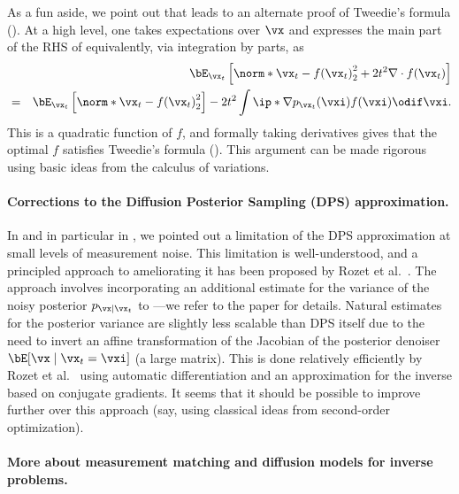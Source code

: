 \documentclass[../../book-main.tex]{subfiles}
\begin{document}
As a fun aside, we point out that  leads to an alternate
proof of Tweedie's formula (). At a high level, one takes
expectations over $\vx$ and expresses the main part of the RHS of
 equivalently, via integration by parts, as
\begin{eqnarray}
    &&\bE_{\vx_t}\left[
        \norm*{\vx_t - f(\vx_t)}_2^2
        + 2t^2 \nabla \cdot f(\vx_t)
    \right] \nonumber \\
    &=&
    \bE_{\vx_t}\left[
        \norm*{\vx_t - f(\vx_t)}_2^2
    \right]
    - 2t^2 \int
    \ip*{\nabla p_{\vx_t}(\vxi)}{f(\vxi)}
    \odif \vxi.
\end{eqnarray}
This is a quadratic function of $f$, and formally taking derivatives gives
that the optimal $f$ satisfies Tweedie's formula (). This
argument can be made rigorous using basic ideas from the calculus of variations.

\paragraph{Corrections to the Diffusion Posterior Sampling (DPS) approximation.}
In  and in particular in
, we pointed out
a limitation of the DPS approximation
 at
small levels of measurement noise.
This limitation is well-understood, and a principled approach to ameliorating it
has been proposed by Rozet et al.\ \cite{rozet2024learning}.
The approach involves incorporating an additional estimate for the variance of
the noisy posterior $p_{\vx \mid \vx_t}$ to
---we
refer to the paper for details.
Natural estimates for the posterior variance are slightly less scalable than DPS
itself due to the need to invert an affine transformation of the Jacobian of
the posterior denoiser $\bE[\vx \mid \vx_t=\vxi]$ (a large matrix). This is done
relatively efficiently by Rozet et al.\ \cite{rozet2024learning}
using automatic differentiation and an
approximation for the inverse based on conjugate gradients. It seems that it
should be possible to improve further over this approach (say, using classical
ideas from second-order optimization).

\paragraph{More about measurement matching and diffusion models for inverse
problems.}
\end{document}
